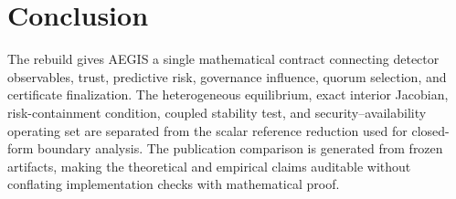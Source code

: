 \documentclass[10pt,journal]{IEEEtran}
\begin{document}
\section{Conclusion}
The rebuild gives AEGIS a single mathematical contract connecting detector observables, trust, predictive risk, governance influence, quorum selection, and certificate finalization. The heterogeneous equilibrium, exact interior Jacobian, risk-containment condition, coupled stability test, and security--availability operating set are separated from the scalar reference reduction used for closed-form boundary analysis. The publication comparison is generated from frozen artifacts, making the theoretical and empirical claims auditable without conflating implementation checks with mathematical proof.
\end{document}
